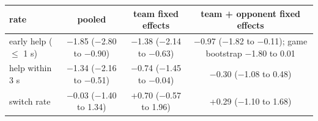 \begin{tabular}{lccc}
\hline
rate & pooled & team fixed effects & team + opponent fixed effects \\
\hline
early help ($\leq$ 1 s) & $-$1.85 ($-$2.80 to $-$0.90) & $-$1.38 ($-$2.14 to $-$0.63) & $-$0.97 ($-$1.82 to $-$0.11); game bootstrap $-$1.80 to 0.01 \\
help within 3 s & $-$1.34 ($-$2.16 to $-$0.51) & $-$0.74 ($-$1.45 to $-$0.04) & $-$0.30 ($-$1.08 to 0.48) \\
switch rate & $-$0.03 ($-$1.40 to 1.34) & +0.70 ($-$0.57 to 1.96) & +0.29 ($-$1.10 to 1.68) \\
\hline
\end{tabular}
